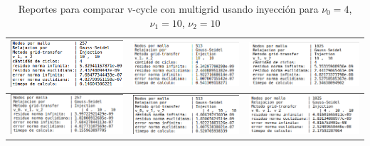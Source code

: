 \documentclass[letter,10pt]{article}
\begin{document}
\begin{table}[H]
\centering
\caption{Reportes para comparar v-cycle con multigrid usando inyección para $\nu_0=4$, $\nu_1=10$, $\nu_2=10$}
\begin{tabular}[t]{|c|c|c|}
\hline
\includegraphics[scale=0.65]{img/reportefmg/reportevc257}
&
\includegraphics[scale=0.65]{img/reportefmg/reportevc513}
&
\includegraphics[scale=0.65]{img/reportefmg/reportevc1025}\\
\hline
\includegraphics[scale=0.65]{img/reportefmg/reportemg257}
&
\includegraphics[scale=0.65]{img/reportefmg/reportemg513}
&
\includegraphics[scale=0.65]{img/reportefmg/reportemg1025}\\
\hline

\end{tabular}

\label{reportesvcvsmg}
\end{table}
\end{document}
